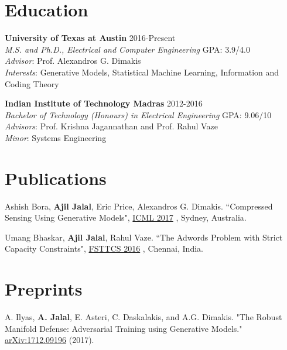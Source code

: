 \documentclass[margin, 11pt]{res} %
\begin{document}
\vspace*{-13pt}
\begin{resume}

 
\section{\large Education}
{\bf University of Texas at Austin} \hfill 2016-Present\\
{\sl M.S. and Ph.D., Electrical and Computer Engineering} \hfill GPA: 3.9/4.0 \\
{\sl Advisor}: Prof. Alexandros G. Dimakis \\
{\sl Interests}: Generative Models, Statistical Machine Learning, Information and Coding Theory

{\bf Indian Institute of Technology Madras} \hfill 2012-2016\\
{\sl Bachelor of Technology (Honours) in Electrical Engineering} \hfill GPA: 9.06/10 \\
{\sl Advisors}: Prof. Krishna Jagannathan and Prof. Rahul Vaze \\
{\sl Minor}: Systems Engineering 

\section{\large Publications} 
Ashish Bora, {\bf Ajil Jalal}, Eric Price, Alexandros G. Dimakis. ``Compressed Sensing Using Generative Models", \href{http://proceedings.mlr.press/v70/bora17a/bora17a.pdf}{ICML 2017} , Sydney, Australia.

Umang Bhaskar, {\bf Ajil Jalal}, Rahul Vaze. ``The Adwords Problem with Strict Capacity Constraints", \href{http://drops.dagstuhl.de/opus/volltexte/2016/6907/pdf/lipics-vol65-fsttcs2016-complete.pdf#page=365}{FSTTCS 2016} , Chennai, India.

\section{\large Preprints}
A. Ilyas, {\bf A. Jalal}, E. Asteri, C. Daskalakis, and A.G. Dimakis. "The Robust Manifold Defense: Adversarial Training using Generative Models." \href{https://arxiv.org/abs/1712.09196}{arXiv:1712.09196} (2017). 

\end{resume}
\end{document}
